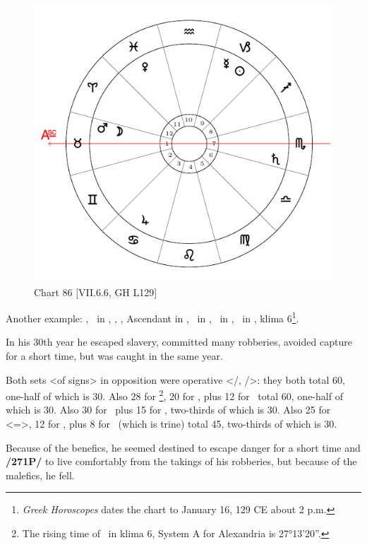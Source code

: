 \newpage
\begin{figure}
\centering
\includegraphics[width=.68\textwidth]{charts/7_6_06}
\caption{Chart 86 [VII.6.6, GH L129]}
\label{fig:chart86}
\end{figure} 

Another example: \Sun, \Mercury\, in \Capricorn, \Moon, \Mars, Ascendant in \Taurus, \Saturn\, in \Scorpio, \Jupiter\, in \Cancer, \Venus\, in \Pisces, klima 6\footnote{\textit{Greek Horoscopes} dates the chart to January 16, 129 CE about 2 p.m.}.

In his 30th year he escaped slavery, committed many robberies, avoided capture for a short time, but was caught in the same year. 

Both sets <of signs> in opposition were operative <\Taurus/\Scorpio, \Cancer/\Capricorn>: they both total 60, one-half of which is 30. Also 28 for \Capricorn\footnote{The rising time of \Capricorn\, in klima 6, System A for Alexandria is 27°13'20''.}, 20 for \Mercury, plus 12 for \Jupiter\, total 60, one-half of which is 30. Also 30 for \Saturn\, plus 15 for \Mars, two-thirds of which is 30. Also 25 for \Cancer\, <=\Moon>, 12 for \Jupiter, plus
8 for \Venus\, (which is trine) total 45, two-thirds of which is 30. 

Because of the benefics, he seemed destined to escape danger for a short time and \textbf{/271P/} to live comfortably from the takings of his robberies, but because of the malefics, he fell.

